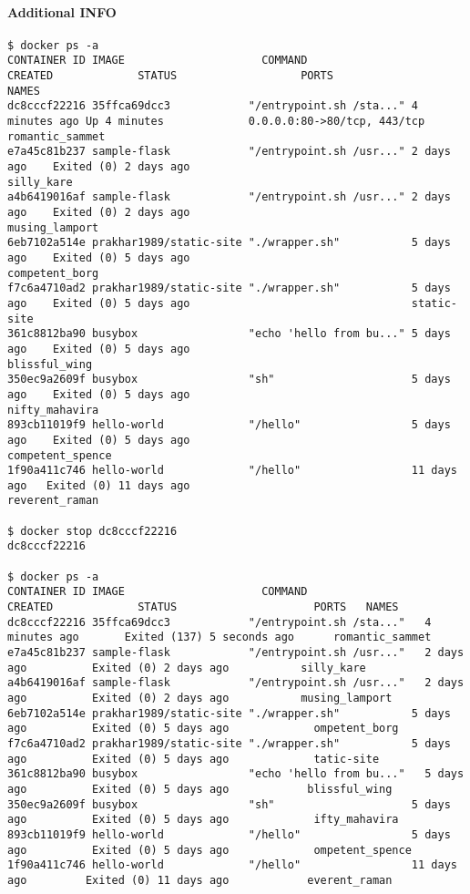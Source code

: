 \paragraph{Additional INFO}


\begin{lstlisting}[basicstyle=\tiny\ttfamily]
$ docker ps -a
CONTAINER ID IMAGE                     COMMAND                  CREATED             STATUS                   PORTS                         NAMES
dc8cccf22216 35ffca69dcc3            "/entrypoint.sh /sta..." 4 minutes ago Up 4 minutes             0.0.0.0:80->80/tcp, 443/tcp   romantic_sammet
e7a45c81b237 sample-flask            "/entrypoint.sh /usr..." 2 days ago    Exited (0) 2 days ago                                  silly_kare
a4b6419016af sample-flask            "/entrypoint.sh /usr..." 2 days ago    Exited (0) 2 days ago                                  musing_lamport
6eb7102a514e prakhar1989/static-site "./wrapper.sh"           5 days ago    Exited (0) 5 days ago                                  competent_borg
f7c6a4710ad2 prakhar1989/static-site "./wrapper.sh"           5 days ago    Exited (0) 5 days ago                                  static-site
361c8812ba90 busybox                 "echo 'hello from bu..." 5 days ago    Exited (0) 5 days ago                                  blissful_wing
350ec9a2609f busybox                 "sh"                     5 days ago    Exited (0) 5 days ago                                  nifty_mahavira
893cb11019f9 hello-world             "/hello"                 5 days ago    Exited (0) 5 days ago                                  competent_spence
1f90a411c746 hello-world             "/hello"                 11 days ago   Exited (0) 11 days ago                                 reverent_raman

$ docker stop dc8cccf22216
dc8cccf22216

$ docker ps -a
CONTAINER ID IMAGE                     COMMAND                  CREATED             STATUS                     PORTS   NAMES
dc8cccf22216 35ffca69dcc3            "/entrypoint.sh /sta..."   4 minutes ago       Exited (137) 5 seconds ago      romantic_sammet
e7a45c81b237 sample-flask            "/entrypoint.sh /usr..."   2 days ago          Exited (0) 2 days ago           silly_kare
a4b6419016af sample-flask            "/entrypoint.sh /usr..."   2 days ago          Exited (0) 2 days ago           musing_lamport
6eb7102a514e prakhar1989/static-site "./wrapper.sh"           5 days ago          Exited (0) 5 days ago             ompetent_borg
f7c6a4710ad2 prakhar1989/static-site "./wrapper.sh"           5 days ago          Exited (0) 5 days ago             tatic-site
361c8812ba90 busybox                 "echo 'hello from bu..."   5 days ago          Exited (0) 5 days ago            blissful_wing
350ec9a2609f busybox                 "sh"                     5 days ago          Exited (0) 5 days ago             ifty_mahavira
893cb11019f9 hello-world             "/hello"                 5 days ago          Exited (0) 5 days ago             ompetent_spence
1f90a411c746 hello-world             "/hello"                 11 days ago         Exited (0) 11 days ago            everent_raman
\end{lstlisting}


